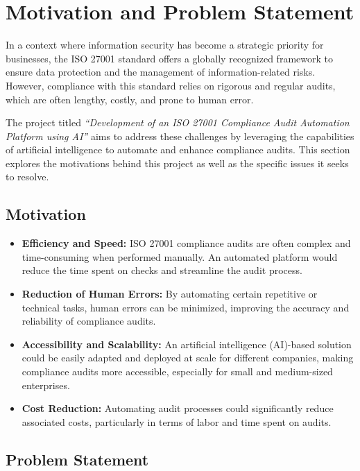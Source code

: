 \section{Motivation and Problem Statement}

In a context where information security has become a strategic priority for businesses, the ISO 27001 standard offers a globally recognized framework to ensure data protection and the management of information-related risks. However, compliance with this standard relies on rigorous and regular audits, which are often lengthy, costly, and prone to human error.

The project titled \textit{“Development of an ISO 27001 Compliance Audit Automation Platform using AI”} aims to address these challenges by leveraging the capabilities of artificial intelligence to automate and enhance compliance audits. This section explores the motivations behind this project as well as the specific issues it seeks to resolve.

\subsection{Motivation}

\begin{itemize}
  \item \textbf{Efficiency and Speed:} ISO 27001 compliance audits are often complex and time-consuming when performed manually. An automated platform would reduce the time spent on checks and streamline the audit process.
  
  \item \textbf{Reduction of Human Errors:} By automating certain repetitive or technical tasks, human errors can be minimized, improving the accuracy and reliability of compliance audits.
  
  \item \textbf{Accessibility and Scalability:} An artificial intelligence (AI)-based solution could be easily adapted and deployed at scale for different companies, making compliance audits more accessible, especially for small and medium-sized enterprises.
  
  \item \textbf{Cost Reduction:} Automating audit processes could significantly reduce associated costs, particularly in terms of labor and time spent on audits.
\end{itemize}

\subsection{Problem Statement}

